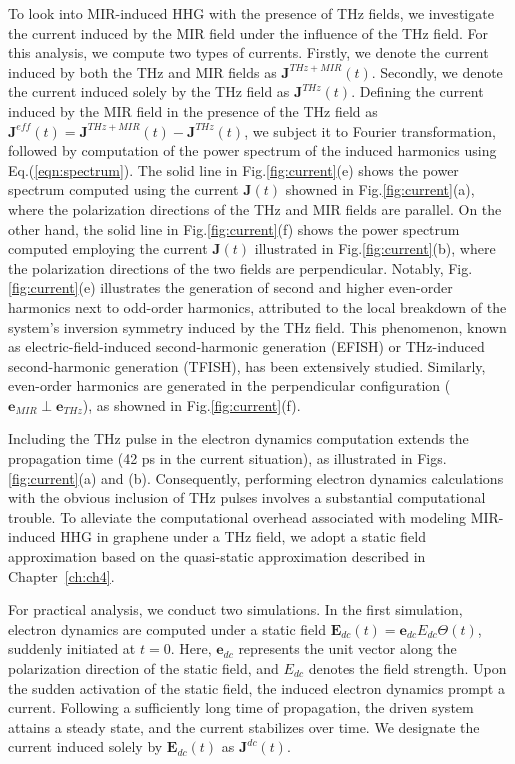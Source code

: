 To look into MIR-induced \gls{HHG} with the presence of THz fields, we investigate the current induced by the MIR field under the influence of the THz field. For this analysis, we compute two types of currents. Firstly, we denote the current induced by both the THz and MIR fields as $\mathbf J^{THz + MIR}(t)$. Secondly, we denote the current induced solely by the THz field as $\mathbf J^{THz}(t)$. Defining the current induced by the MIR field in the presence of the THz field as $\mathbf J^{eff}(t) = \mathbf J^{THz + MIR}(t) - \mathbf J^{THz}(t)$, we subject it to Fourier transformation, followed by computation of the power spectrum of the induced harmonics using Eq.(\ref{eqn:spectrum}). The solid line in Fig.\ref{fig:current}(e) shows the power spectrum computed using the current $\mathbf J(t)$ showned in Fig.\ref{fig:current}(a), where the polarization directions of the THz and MIR fields are parallel. On the other hand, the solid line in Fig.\ref{fig:current}(f) shows the power spectrum computed employing the current $\mathbf J(t)$ illustrated in Fig.\ref{fig:current}(b), where the polarization directions of the two fields are perpendicular. Notably, Fig.\ref{fig:current}(e) illustrates the generation of second and higher even-order harmonics next to odd-order harmonics, attributed to the local breakdown of the system's inversion symmetry induced by the THz field. This phenomenon, known as electric-field-induced second-harmonic generation (EFISH) or THz-induced second-harmonic generation (TFISH), has been extensively studied\cite{PhysRevLett.8.404,PhysRev.137.A801,Nahata:98,COOK1999221}. Similarly, even-order harmonics are generated in the perpendicular configuration ($\mathbf e_{MIR} \perp \mathbf e_{THz}$), as showned in Fig.\ref{fig:current}(f).

Including the THz pulse in the electron dynamics computation extends the propagation time (42 ps in the current situation), as illustrated in Figs.\ref{fig:current}(a) and (b). Consequently, performing electron dynamics calculations with the obvious inclusion of THz pulses involves a substantial computational trouble. To alleviate the computational overhead associated with modeling MIR-induced \gls{HHG} in graphene under a THz field, we adopt a static field approximation based on the quasi-static approximation described in Chapter~\ref{ch:ch4}.

For practical analysis, we conduct two simulations. In the first simulation, electron dynamics are computed under a static field $\mathbf E_{dc}(t) = \mathbf e_{dc} E_{dc}\Theta(t)$, suddenly initiated at $t=0$. Here, $\mathbf e_{dc}$ represents the unit vector along the polarization direction of the static field, and $E_{dc}$ denotes the field strength. Upon the sudden activation of the static field, the induced electron dynamics prompt a current. Following a sufficiently long time of propagation, the driven system attains a steady state, and the current stabilizes over time. We designate the current induced solely by $\mathbf E_{dc}(t)$ as $\mathbf J^{dc}(t)$.

